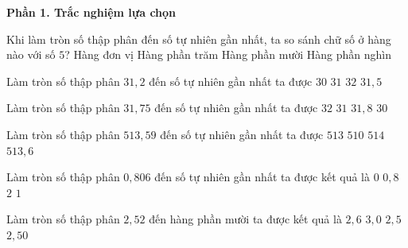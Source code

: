 \textbf{Phần 1. Trắc nghiệm lựa chọn}

\begin{ex} %
Khi làm tròn số thập phân đến số tự nhiên gần nhất, ta so sánh chữ số ở hàng nào với số $5$?
\choice
{Hàng đơn vị}
{Hàng phần trăm}
{\True Hàng phần mười}
{Hàng phần nghìn}
\end{ex}

\begin{ex} %
Làm tròn số thập phân $31{,}2$ đến số tự nhiên gần nhất ta được
\choice
{$30$}
{\True $31$}
{$32$}
{$31{,}5$}
\end{ex}

\begin{ex} %
Làm tròn số thập phân $31{,}75$ đến số tự nhiên gần nhất ta được
\choice
{\True $32$}
{$31$}
{$31{,}8$}
{$30$}
\end{ex}

\begin{ex} %
Làm tròn số thập phân $513{,}59$ đến số tự nhiên gần nhất ta được
\choice
{$513$}
{$510$}
{\True $514$}
{$513{,}6$}
\end{ex}

\begin{ex} %
Làm tròn số thập phân $0{,}806$ đến số tự nhiên gần nhất ta được kết quả là
\choice
{$0$}
{$0{,}8$}
{$2$}
{\True $1$}
\end{ex}

\begin{ex} %
Làm tròn số thập phân $2{,}52$ đến hàng phần mười ta được kết quả là
\choice
{$2{,}6$}
{$3{,}0$}
{\True $2{,}5$}
{$2{,}50$}
\end{ex}

